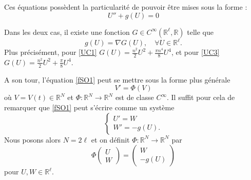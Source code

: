 \documentclass[11pt,a4paper]{article}
\begin{document}
Ces équations possèdent la particularité de pouvoir être mises sous la forme : 
\begin{equation} \label{fSO1} 
U'' + g (U) =0
\end{equation} 

Dans les deux cas, il existe une fonction $G\in C^\infty ( \mathbb{R}^{\ell}, \mathbb{R} )$ telle que
\begin{equation} \label{fSO2} 
g(U) = \nabla G (U), \quad \forall U\in \mathbb{R}^{\ell} .
\end{equation} 
Plus précisément, pour \eqref{UC1} $G (U)=   \frac {n^2} {2} U^2+  \frac {\pi n^4} {8}   U^4 $, et pour \eqref{UC3}   $G(U)=  \frac {n^2} {2} U^2 +   \frac {\pi } {8}   U^4$. 

A son tour, l'équation \eqref{fSO1} peut se mettre sous la forme plus générale
\begin{equation} \label{fCL1} 
V' = \Phi (V) 
\end{equation} 
où $V=V(t) \in \mathbb{R}^N $ et $\Phi : \mathbb{R}^N \to \mathbb{R}^N$ est de classe $C^\infty $. 
Il suffit pour cela de remarquer que \eqref{fSO1} peut s'écrire comme un système
\begin{equation} \label{fSO5} 
\begin{cases} 
U'= W \\ W' = - g( U). 
\end{cases} 
\end{equation} 
Nous posons alors $N= 2 \ell $ et on définit $\Phi : \mathbb{R}^N \to \mathbb{R}^N $ par
\begin{equation} \label{fSO6} 
\Phi \begin{pmatrix} U \\W \end{pmatrix} = \begin{pmatrix} W \\ - g(U) \end{pmatrix} 
\end{equation} 
pour $U, W\in \mathbb{R}^\ell$. 
\\
\end{document}
